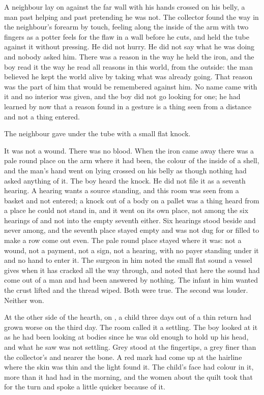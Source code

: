 A neighbour lay on  against the far wall with his hands crossed on his belly, a man past helping and past pretending he was not. The collector found the way in the neighbour's forearm by touch, feeling along the inside of the arm with two fingers as a potter feels for the flaw in a wall before he cuts, and held the tube against it without pressing. He did not hurry. He did not say what he was doing and nobody asked him. There was a reason in the way he held the iron, and the boy read it the way he read all reasons in this world, from the outside: the man believed he kept the world alive by taking what was already going. That reason was the part of him that would be remembered against him. No name came with it and no interior was given, and the boy did not go looking for one; he had learned by now that a reason found in a gesture is a thing seen from a distance and not a thing entered.

\scenebreak

The neighbour gave under the tube with a small flat knock.

It was not a wound. There was no blood. When the iron came away there was a pale round place on the arm where it had been, the colour of the inside of a shell, and the man's hand went on lying crossed on his belly as though nothing had asked anything of it. The boy heard the knock. He did not file it as a seventh hearing. A hearing wants a source standing, and this room was seen from a basket and not entered; a knock out of a body on a pallet was a thing heard from a place he could not stand in, and it went on its own place, not among the six hearings of  and not into the empty seventh either. Six hearings stood beside and never among, and the seventh place stayed empty and was not dug for or filled to make a row come out even. The pale round place stayed where it was: not a wound, not a payment, not a sign, not a hearing, with no payer standing under it and no hand to enter it. The surgeon in him noted the small flat sound a vessel gives when it has cracked all the way through, and noted that here the sound had come out of a man and had been answered by nothing. The infant in him wanted the crust lifted and the thread wiped. Both were true. The second was louder. Neither won.

\scenebreak

At the other side of the hearth, on , a child three days out of a thin return had grown worse on the third day. The room called it a  settling. The boy looked at it as he had been looking at bodies since he was old enough to hold up his head, and what he saw was not settling. Grey stood at the fingertips, a grey finer than the collector's and nearer the bone. A red mark had come up at the hairline where the skin was thin and the light found it. The child's face had colour in it, more than it had had in the morning, and the women about the quilt took that for the turn and spoke a little quicker because of it.

